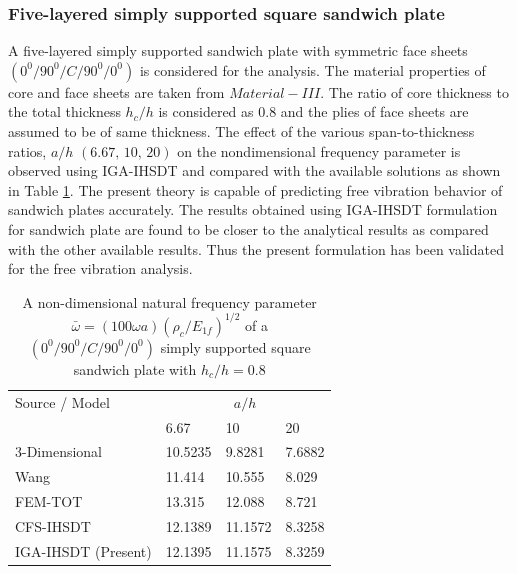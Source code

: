 \documentclass[3p,preprint,12pt]{elsarticle}
\begin{document}
\subsubsection{Five-layered simply supported square sandwich plate}
A five-layered simply supported sandwich plate with symmetric face sheets $(0^{0}/90^{0}/C/90^{0}/0^{0})$ is considered for the analysis. The material properties of core and face sheets are taken from $Material-III$. The ratio of core thickness to the total thickness $h_c/h$ is considered as $0.8$ and the plies of face sheets are assumed to be  of same thickness. The effect of the various span-to-thickness ratios,  $a/h$ $(6.67,\,10,\,20)$ on the nondimensional frequency parameter is observed using IGA-IHSDT and compared with the available solutions as shown in Table \ref{tab:Free_Vib_Sandwich}. The present theory is capable of predicting free vibration behavior of sandwich plates accurately. The results obtained using IGA-IHSDT formulation for sandwich  plate are found to be closer to the analytical results \cite{grover2013analytical} as compared with the other available results. Thus the present formulation has been validated for the free vibration analysis. %


\begin{table}
	\caption{\label{tab:Free_Vib_Sandwich}A non-dimensional natural frequency parameter $\bar{\omega}=(100\omega a)(\rho_{c}/E_{1f})^{1/2}$	of a $\left(0^{0}/90^{0}/C/90^{0}/0^{0}\right)$ simply supported	square sandwich plate with $h_{c}/h=0.8$}
	\centering{}%
	\begin{tabular}{llll}
		\hline 
		Source / Model &   \multicolumn{3}{c}{$a/h$}\tabularnewline
		\cline{2-4} 
		& 6.67 & 10 & 20\tabularnewline
		\hline 
		3-Dimensional \cite{kulkarni2008free} & 10.5235 & 9.8281 & 7.6882\tabularnewline
		Wang \cite{wang2000free} & 11.414 & 10.555 & 8.029\tabularnewline
		FEM-TOT \cite{kulkarni2008free} & 13.315 & 12.088 & 8.721\tabularnewline
		CFS-IHSDT \cite{grover2013analytical}& 12.1389 & 11.1572 & 8.3258\tabularnewline
		IGA-IHSDT (Present) & 12.1395 & 11.1575 & 8.3259\tabularnewline
		\hline 
	\end{tabular}
\end{table}
\end{document}
